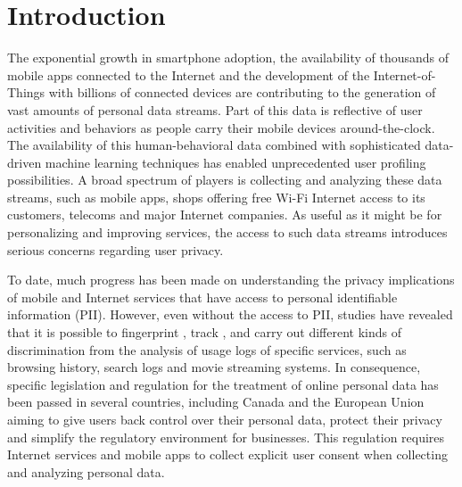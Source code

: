 \section{Introduction}

The exponential growth in smartphone adoption, the availability of thousands of mobile apps connected to the Internet and the development of the Internet-of-Things with billions of connected devices are contributing to the generation of vast amounts of personal data streams. Part of this data is reflective of user activities and behaviors as people carry their mobile devices around-the-clock. The availability of this human-behavioral data combined with sophisticated data-driven machine learning techniques has enabled unprecedented user profiling possibilities. A broad spectrum of players is collecting and analyzing these data streams, such as mobile apps, shops offering free Wi-Fi Internet access to its customers, telecoms and major Internet companies. As useful as it might be for personalizing and improving services, the access to such data streams introduces serious concerns regarding user privacy. 

To date, much progress has been made on understanding the privacy implications of mobile and Internet services that have access to personal identifiable information (PII). However, even without the access to PII, studies have revealed that it is possible to fingerprint \cite{narayanan2008robust}, track \cite{de2013unique}, and carry out different kinds of discrimination \cite{hannak2014measuring} from the analysis of usage logs of specific services, such as browsing history, search logs and movie streaming systems. In consequence, specific legislation and regulation for the treatment of online personal data has been passed in several countries, including Canada and the European Union \cite{ECPPD} aiming to give users back control over their personal data, protect their privacy and simplify the regulatory environment for businesses. This regulation requires Internet services and mobile apps to collect explicit user consent when collecting and analyzing personal data.

